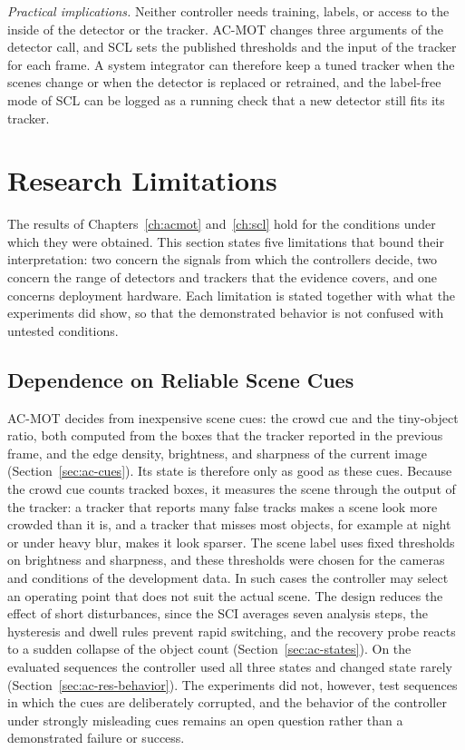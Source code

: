 \emph{Practical implications.} Neither controller needs training, labels, or access to the inside of the detector or the tracker. AC-MOT changes three arguments of the detector call, and SCL sets the published thresholds and the input of the tracker for each frame. A system integrator can therefore keep a tuned tracker when the scenes change or when the detector is replaced or retrained, and the label-free mode of SCL can be logged as a running check that a new detector still fits its tracker.

\section{Research Limitations}\label{sec:conc-limitations}
The results of Chapters~\ref{ch:acmot} and~\ref{ch:scl} hold for the conditions under which they were obtained. This section states five limitations that bound their interpretation: two concern the signals from which the controllers decide, two concern the range of detectors and trackers that the evidence covers, and one concerns deployment hardware. Each limitation is stated together with what the experiments did show, so that the demonstrated behavior is not confused with untested conditions.

\subsection{Dependence on Reliable Scene Cues}\label{sec:lim-cues}
AC-MOT decides from inexpensive scene cues: the crowd cue and the tiny-object ratio, both computed from the boxes that the tracker reported in the previous frame, and the edge density, brightness, and sharpness of the current image (Section~\ref{sec:ac-cues}). Its state is therefore only as good as these cues. Because the crowd cue counts tracked boxes, it measures the scene through the output of the tracker: a tracker that reports many false tracks makes a scene look more crowded than it is, and a tracker that misses most objects, for example at night or under heavy blur, makes it look sparser. The scene label uses fixed thresholds on brightness and sharpness, and these thresholds were chosen for the cameras and conditions of the development data. In such cases the controller may select an operating point that does not suit the actual scene. The design reduces the effect of short disturbances, since the SCI averages seven analysis steps, the hysteresis and dwell rules prevent rapid switching, and the recovery probe reacts to a sudden collapse of the object count (Section~\ref{sec:ac-states}). On the evaluated sequences the controller used all three states and changed state rarely (Section~\ref{sec:ac-res-behavior}). The experiments did not, however, test sequences in which the cues are deliberately corrupted, and the behavior of the controller under strongly misleading cues remains an open question rather than a demonstrated failure or success.

